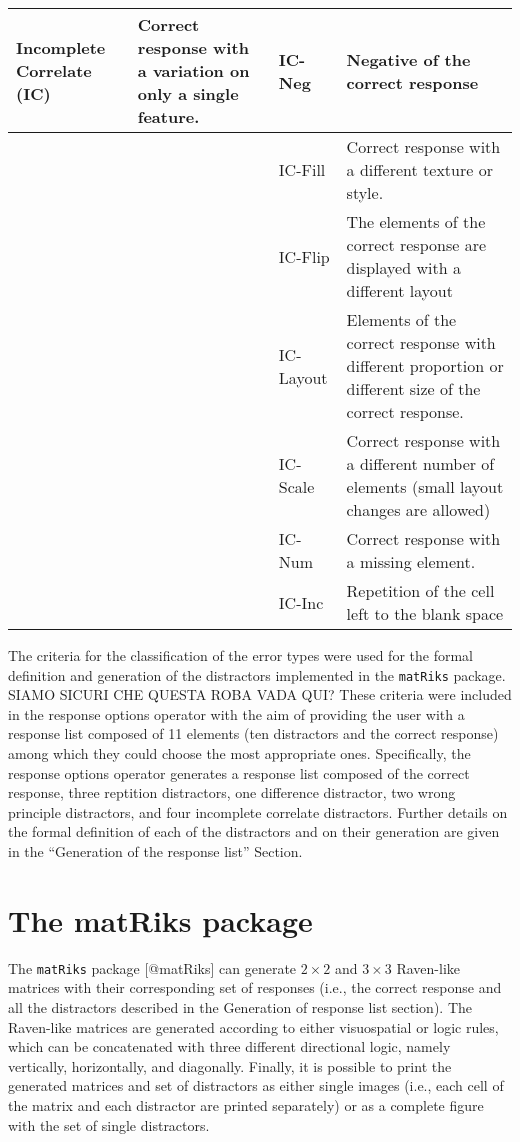 \begin{table}
\begin{tabular}[t]{>{}l|l|l|l}
\hline
\textbf{Incomplete Correlate (IC)} & Correct response with a variation on only a single feature. & IC-Neg & Negative of the correct response\\
\hline
\textbf{} &  & IC-Fill & Correct response with a different texture or style.\\
\hline
\textbf{} &  & IC-Flip & The elements of the correct response are displayed with a different layout\\
\hline
\textbf{} &  & IC-Layout & Elements of the correct response with different proportion or different size of the correct response.\\
\hline
\textbf{} &  & IC-Scale & Correct response with a different number of elements (small layout changes are allowed)\\
\hline
\textbf{} &  & IC-Num & Correct response with a missing element.\\
\hline
\textbf{} &  & IC-Inc & Repetition of the cell left to the blank space\\
\hline
\end{tabular}
\end{table}

The criteria for the classification of the error types were used for the formal definition and generation of the distractors implemented in the \texttt{matRiks} package.
SIAMO SICURI CHE QUESTA ROBA VADA QUI?
These criteria were included in the response options operator with the aim of providing the user with a response list composed of 11 elements (ten distractors and the correct response) among which they could choose the most appropriate ones.
Specifically, the response options operator generates a response list composed of the correct response, three reptition distractors, one difference distractor, two wrong principle distractors, and four incomplete correlate distractors.
Further details on the formal definition of each of the distractors and on their generation are given in the ``Generation of the response list'' Section.

\section{The matRiks package}\label{the-matriks-package}

The \texttt{matRiks} package {[}@matRiks{]} can generate \(2 \times 2\) and \(3 \times 3\) Raven-like matrices with their corresponding set of responses (i.e., the correct response and all the distractors described in the Generation of response list section).
The Raven-like matrices are generated according to either visuospatial or logic rules, which can be concatenated with three different directional logic, namely vertically, horizontally, and diagonally.
Finally, it is possible to print the generated matrices and set of distractors as either single images (i.e., each cell of the matrix and each distractor are printed separately) or as a complete figure with the set of single distractors.

